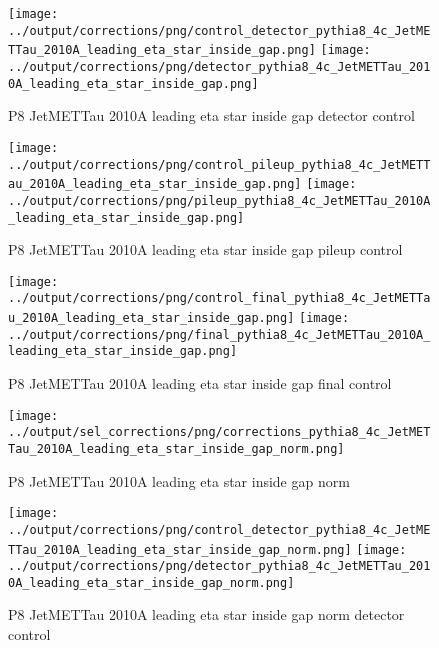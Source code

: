 \documentclass[11pt]{book}
\begin{document}
\begin{figure}[ht]
\centering
\texttt{[image: ../output/corrections/png/control\_detector\_pythia8\_4c\_JetMETTau\_2010A\_leading\_eta\_star\_inside\_gap.png]}
\texttt{[image: ../output/corrections/png/detector\_pythia8\_4c\_JetMETTau\_2010A\_leading\_eta\_star\_inside\_gap.png]}
\caption{P8 JetMETTau 2010A leading eta star inside gap detector control}
\label{fig:p8_JetMETTau_2010A_leading_eta_star_inside_gap_detector_control}
\end{figure}

\begin{figure}[ht]
\centering
\texttt{[image: ../output/corrections/png/control\_pileup\_pythia8\_4c\_JetMETTau\_2010A\_leading\_eta\_star\_inside\_gap.png]}
\texttt{[image: ../output/corrections/png/pileup\_pythia8\_4c\_JetMETTau\_2010A\_leading\_eta\_star\_inside\_gap.png]}
\caption{P8 JetMETTau 2010A leading eta star inside gap pileup control}
\label{fig:p8_JetMETTau_2010A_leading_eta_star_inside_gap_pileup_control}
\end{figure}


\begin{figure}[ht]
\centering
\texttt{[image: ../output/corrections/png/control\_final\_pythia8\_4c\_JetMETTau\_2010A\_leading\_eta\_star\_inside\_gap.png]}
\texttt{[image: ../output/corrections/png/final\_pythia8\_4c\_JetMETTau\_2010A\_leading\_eta\_star\_inside\_gap.png]}
\caption{P8 JetMETTau 2010A leading eta star inside gap final control}
\label{fig:p8_JetMETTau_2010A_leading_eta_star_inside_gap_final_control}
\end{figure}



\begin{figure}[ht]
\centering
\texttt{[image: ../output/sel\_corrections/png/corrections\_pythia8\_4c\_JetMETTau\_2010A\_leading\_eta\_star\_inside\_gap\_norm.png]}
\caption{P8 JetMETTau 2010A leading eta star inside gap norm}
\label{fig:p8_JetMETTau_2010A_leading_eta_star_inside_gap_norm}
\end{figure}

\begin{figure}[ht]
\centering
\texttt{[image: ../output/corrections/png/control\_detector\_pythia8\_4c\_JetMETTau\_2010A\_leading\_eta\_star\_inside\_gap\_norm.png]}
\texttt{[image: ../output/corrections/png/detector\_pythia8\_4c\_JetMETTau\_2010A\_leading\_eta\_star\_inside\_gap\_norm.png]}
\caption{P8 JetMETTau 2010A leading eta star inside gap norm detector control}
\label{fig:p8_JetMETTau_2010A_leading_eta_star_inside_gap_norm_detector_control}
\end{figure}
\end{document}
